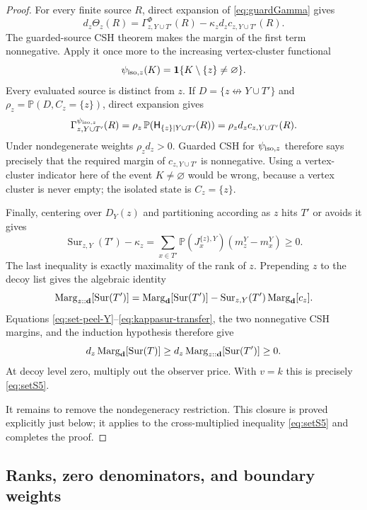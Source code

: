 \documentclass[11pt]{article}
\theoremstyle{definition}
\theoremstyle{remark}
\newcommand{\PP}{\mathbb P}
\newcommand{\one}{\mathbf 1}
\newcommand{\Sur}{\operatorname{Sur}}
\newcommand{\ncon}{\not\leftrightarrow}
\begin{document}
\begin{proof}
For every finite source $R$, direct expansion of
\eqref{eq:guardGamma}
gives
\begin{equation}\label{eq:theta-cov}
 d_z\Theta_z(R)=
 \Gamma_{z,Y\cup T'}^{\Phi}(R)
 -\kappa_z d_z c_{z,Y\cup T'}(R).
\end{equation}
The guarded-source CSH theorem makes the margin of the first term
nonnegative.  Apply it once more to the increasing vertex-cluster
functional
\[
 \psi_{{\rm iso},z}(K)=\one\{K\setminus\{z\}\ne\varnothing\}.
\]
Every evaluated source is distinct from $z$.  If
$D=\{z\ncon Y\cup T'\}$ and
$\rho_z=\PP(D,C_z=\{z\})$, direct expansion gives
\begin{equation}\label{eq:iso-guard-identity}
 \Gamma_{z,Y\cup T'}^{\psi_{{\rm iso},z}}(R)
 =\rho_z\,\PP(\mathsf H_{\{z\}\mid Y\cup T'}(R))
 =\rho_z d_z c_{z,Y\cup T'}(R).
\end{equation}
Under nondegenerate weights $\rho_z d_z>0$.  Guarded CSH for
$\psi_{{\rm iso},z}$ therefore says precisely that the required margin of
$c_{z,Y\cup T'}$ is nonnegative.  Using a vertex-cluster indicator here
of the event $K\ne\varnothing$ would be wrong, because a vertex cluster
is never empty; the isolated state is $C_z=\{z\}$.

Finally, centering over $D_Y(z)$ and partitioning according as $z$ hits
$T'$ or avoids it gives
\begin{equation}\label{eq:kappasur-transfer}
 \Sur_{z,Y}(T')-\kappa_z
 =\sum_{x\in T'}\PP(J_x^{\{z\},Y})(m_z^Y-m_x^Y)\geq0.
\end{equation}
The last inequality is exactly maximality of the rank of $z$.  Prepending
$z$ to the decoy list gives the algebraic identity
\[
 \operatorname{Marg}_{z::{\bf d}}[\Sur(T')]
 =\operatorname{Marg}_{\bf d}[\Sur(T')]
  -\Sur_{z,Y}(T')\operatorname{Marg}_{\bf d}[c_z].
\]
Equations \eqref{eq:set-peel-Y}--\eqref{eq:kappasur-transfer}, the two
nonnegative CSH margins, and the induction hypothesis therefore give
\[
 d_z\operatorname{Marg}_{\bf d}[\Sur(T)]
 \geq d_z\operatorname{Marg}_{z::{\bf d}}[\Sur(T')]
 \geq0.
\]
At decoy level zero, multiply out the observer price.  With $v=k$ this
is precisely \eqref{eq:setS5}.

It remains to remove the nondegeneracy restriction.  This closure is
proved explicitly just below; it applies to the cross-multiplied
inequality \eqref{eq:setS5} and completes the proof.
\end{proof}

\subsection{Ranks, zero denominators, and boundary weights}
\end{document}
